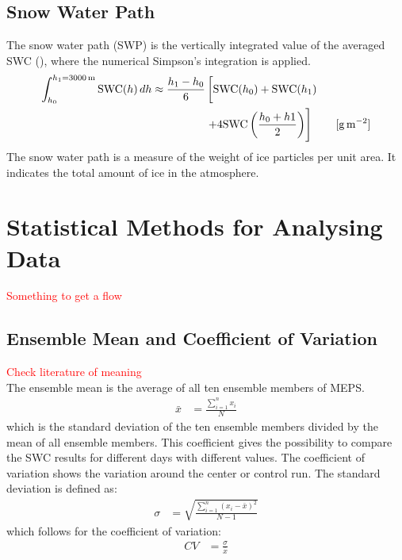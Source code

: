 \subsection{Snow Water Path}\label{sec:SWP}
The snow water path (SWP) is the vertically integrated value of the averaged SWC (), where the numerical Simpson's integration is applied.  
\begin{equation}
\begin{split}
\int_{h_0}^{h_1=\SI{3000}{\metre}} \text{SWC}(h) \, dh \approx 
\frac{h_1 - h_0}{6}  & \left[ \text{SWC}(h_0)    + \text{SWC}(h_1)   \vphantom{\frac{h_0 + h1}{2}} \right. \\ 
& \left. + 4 \text{SWC}\left(\frac{h_0 + h1}{2}\right)  
\right] \qquad [\SI{}{\g\per\square\meter}]
\end{split}
\label{eq:SWP}
\end{equation}
The snow water path is a measure of the weight of ice particles per unit area. It indicates the total amount of ice in the atmosphere.
\section{Statistical Methods for Analysing Data}
\textcolor{red}{Something to get a flow}
\subsection{Ensemble Mean and Coefficient of Variation}\label{sec:ens_mean_spread}
\textcolor{red}{Check literature of meaning} \\
The ensemble mean is the average of all ten ensemble members of MEPS.
\begin{align}
	\bar{x} & = \frac{\sum_{i=1}^n x_i}{N} \label{eq:meanMEPS}
\end{align}
which is the standard deviation of the ten ensemble members divided by the mean of all ensemble members. This coefficient gives the possibility to compare the SWC results for different days with different values. 
The coefficient of variation shows the variation around the center or control run.
The standard deviation is defined as:
\begin{align}
	\sigma & = \sqrt{\frac{\sum_{i=1}^n (x_i - \bar{x})^2}{N-1}} \label{eq:stdMEPS}
\end{align}
which follows for the coefficient of variation:
\begin{align}
	CV & = \frac{\sigma}{\bar{x}}
\end{align}

